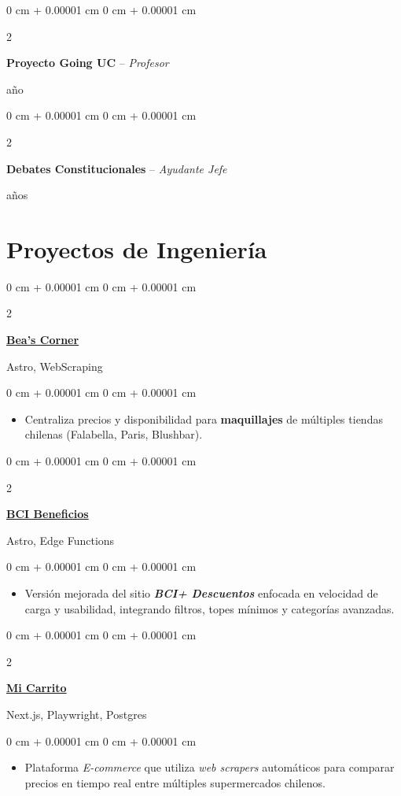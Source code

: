 \documentclass[10pt, letterpaper]{article}
\newenvironment{highlights}{
    \begin{itemize}[
        topsep=0.10 cm,
        parsep=0.10 cm,
        partopsep=0pt,
        itemsep=0pt,
        leftmargin=0 cm + 10pt
    ]
}{
    \end{itemize}
} %
\newenvironment{onecolentry}{
    \begin{adjustwidth}{
        0 cm + 0.00001 cm
    }{
        0 cm + 0.00001 cm
    }
}{
    \end{adjustwidth}
} %
\newenvironment{twocolentry}[2][]{
    \onecolentry
    \def\secondColumn{#2}
    \setcolumnwidth{\fill, 4.5 cm}
    \begin{paracol}{2}
}{
    \switchcolumn \raggedleft \secondColumn
    \end{paracol}
    \endonecolentry
} %
\let\hrefWithoutArrow\href
\begin{document}
    \begin{twocolentry}{1 año}
        \textbf{Proyecto Going UC} -- \textit{Profesor}
    \end{twocolentry}
    \vspace{0.2 cm}

    \begin{twocolentry}{2 años}
        \textbf{Debates Constitucionales} -- \textit{Ayudante Jefe}
    \end{twocolentry}

    \section{Proyectos de Ingeniería}

    \begin{twocolentry}{Astro, WebScraping}
        \textbf{\hrefWithoutArrow{https://beascorner.onrender.com/}{Bea's Corner}}
    \end{twocolentry}
    \vspace{0.10 cm}
    \begin{onecolentry}
        \begin{highlights}
            \item Centraliza precios y disponibilidad  para \textbf{maquillajes} de múltiples tiendas chilenas (Falabella, Paris, Blushbar).
        \end{highlights}
    \end{onecolentry}
    \vspace{0.2 cm}
    
    \begin{twocolentry}{Astro, Edge Functions}
        \textbf{\href{https://bcibeneficios.onrender.com/}{BCI Beneficios}}
    \end{twocolentry}
    \vspace{0.10 cm}
    \begin{onecolentry}
        \begin{highlights}
            \item Versión mejorada del sitio \textbf{\textit{BCI+ Descuentos} }enfocada en velocidad de carga y usabilidad, integrando filtros, topes mínimos y categorías avanzadas.
        \end{highlights}
    \end{onecolentry}
    \vspace{0.2 cm}


    \begin{twocolentry}{Next.js, Playwright, Postgres}
        \textbf{\hrefWithoutArrow{https://micarritochile.vercel.app/}{Mi Carrito}}
    \end{twocolentry}
    \vspace{0.10 cm}
    \begin{onecolentry}
        \begin{highlights}
            \item Plataforma \textit{E-commerce} que utiliza \textit{web scrapers} automáticos para comparar precios en tiempo real entre múltiples supermercados chilenos.
        \end{highlights}
    \end{onecolentry}
\end{document}
